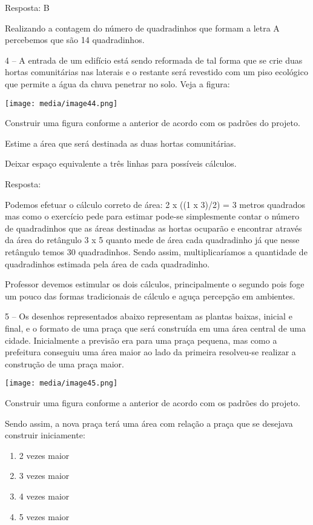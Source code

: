Resposta: B

Realizando a contagem do número de quadradinhos que formam a letra A
percebemos que são 14 quadradinhos.

4 -- A entrada de um edifício está sendo reformada de tal forma que se
crie duas hortas comunitárias nas laterais e o restante será revestido
com um piso ecológico que permite a água da chuva penetrar no solo. Veja
a figura:

\texttt{[image: media/image44.png]}

Construir uma figura conforme a anterior de acordo com os padrões do
projeto.

Estime a área que será destinada as duas hortas comunitárias.

Deixar espaço equivalente a três linhas para possíveis cálculos.

Resposta:

Podemos efetuar o cálculo correto de área: 2 x ((1 x 3)/2) = 3 metros
quadrados mas como o exercício pede para estimar pode-se simplesmente
contar o número de quadradinhos que as áreas destinadas as hortas
ocuparão e encontrar através da área do retângulo 3 x 5 quanto mede de
área cada quadradinho já que nesse retângulo temos 30 quadradinhos.
Sendo assim, multiplicaríamos a quantidade de quadradinhos estimada pela
área de cada quadradinho.

Professor devemos estimular os dois cálculos, principalmente o segundo
pois foge um pouco das formas tradicionais de cálculo e aguça percepção
em ambientes.

5 -- Os desenhos representados abaixo representam as plantas baixas,
inicial e final, e o formato de uma praça que será construída em uma
área central de uma cidade. Inicialmente a previsão era para uma praça
pequena, mas como a prefeitura conseguiu uma área maior ao lado da
primeira resolveu-se realizar a construção de uma praça maior.

\texttt{[image: media/image45.png]}

Construir uma figura conforme a anterior de acordo com os padrões do
projeto.

Sendo assim, a nova praça terá uma área com relação a praça que se
desejava construir iniciamente:

\begin{enumerate}
\def\labelenumi{\alph{enumi})}
\item
  2 vezes maior
\item
  3 vezes maior
\item
  4 vezes maior
\item
  5 vezes maior
\end{enumerate}

